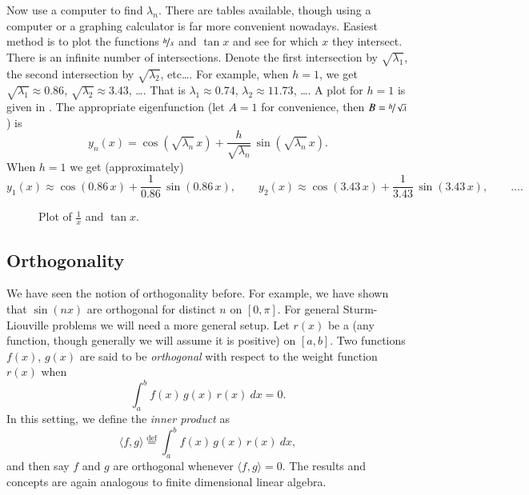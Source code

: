 \documentclass[12pt]{book}
\begin{document}
\begin{example}
Now use a computer to find $\lambda_n$.  There are tables available,
though using a computer or a graphing calculator
is far more convenient nowadays.
Easiest method is to plot the functions 
$\nicefrac{h}{x}$ and $\tan x$ and see for which $x$ they intersect.
There is an infinite number of intersections.  Denote
the first intersection
by $\sqrt{\lambda_1}$,
the second intersection by $\sqrt{\lambda_2}$, etc\ldots.
For example, when
$h=1$, we get $\sqrt{\lambda_1} \approx 0.86$, 
$\sqrt{\lambda_2} \approx 3.43$, \ldots.
That is $\lambda_1 \approx 0.74$, $\lambda_2 \approx 11.73$, \ldots.
A plot for $h=1$ is given in .
The appropriate eigenfunction
(let $A = 1$ for convenience, then
$B=\nicefrac{h}{\sqrt{\lambda}}$) is
\begin{equation*}
y_n(x) = \cos (\! \sqrt{\lambda_n}\, x ) + \frac{h}{\sqrt{\lambda_n}} \,
\sin (\!\sqrt{\lambda_n} \, x ) .
\end{equation*}
When $h=1$ we get (approximately)
\begin{equation*}
y_1(x) \approx \cos (0.86\, x ) + \frac{1}{0.86} \,
\sin (0.86 \, x ) , \qquad
y_2(x) \approx \cos (3.43\, x ) + \frac{1}{3.43} \,
\sin (3.43 \, x ) , \qquad \ldots .
\end{equation*}
\begin{figure}[h!t]
\capstart
\begin{center}
\caption{Plot of $\frac{1}{x}$ and $\tan x$.%
\label{sl:tanx1overxfig}}
\end{center}
\end{figure}
\end{example}

\subsection{Orthogonality}

We have seen the notion of orthogonality before.  For example,
we have shown that $\sin (nx)$ are orthogonal for distinct $n$ on $[0,\pi]$.
For general Sturm-Liouville problems we will need a more general setup.
Let $r(x)$
be a \emph{} (any function, though generally we will
assume it is positive) on $[a,b]$.  Two functions $f(x)$, $g(x)$
are said to be
\emph{orthogonal} 
with respect to the weight function
$r(x)$ when
\begin{equation*}
\int_a^b f(x) \, g(x) \, r(x) ~dx = 0 .
\end{equation*}
In this setting,
we define the \emph{inner product} as
\begin{equation*}
\langle f , g \rangle \overset{\text{def}}{=} \int_a^b f(x) \, g(x) \, r(x) ~dx ,
\end{equation*}
and then say $f$ and $g$ are orthogonal whenever $\langle f , g \rangle = 0$.
The results and concepts are again analogous to 
finite dimensional linear algebra.
\end{document}
